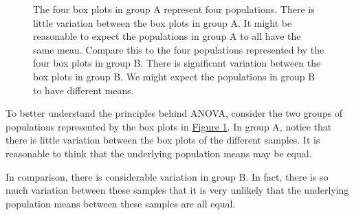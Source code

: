 \documentclass[letterpaper,10pt,english]{jupyterBook}
\begin{document}
\begin{figure}[htbp]
\centering
\capstart

\noindent{}
\caption{The four box plots in group A represent four populations. There is little variation between the box plots in group A. It might be reasonable to expect the populations in group A to all have the same mean. Compare this to the four populations represented by the four box plots in group B. There is significant variation between the box plots in group B. We might expect the populations in group B to have different means.}\label{\detokenize{Ch9 Hypothesis Tests of Two or More Populations/9.3 ANOVA:anova-illustration}}\end{figure}

\sphinxAtStartPar
To better understand the principles behind ANOVA, consider the two groups of populations represented by the box plots in \hyperref[\detokenize{Ch9 Hypothesis Tests of Two or More Populations/9.3 ANOVA:anova-illustration}]{Figure \ref{\detokenize{Ch9 Hypothesis Tests of Two or More Populations/9.3 ANOVA:anova-illustration}}}. In group A, notice that there is little variation between the box plots of the different samples. It is reasonable to think that the underlying population means may be equal.

\sphinxAtStartPar
In comparison, there is considerable variation in group B. In fact, there is so much variation between these samples that it is very unlikely that the underlying population means between these samples are all equal.
\end{document}
